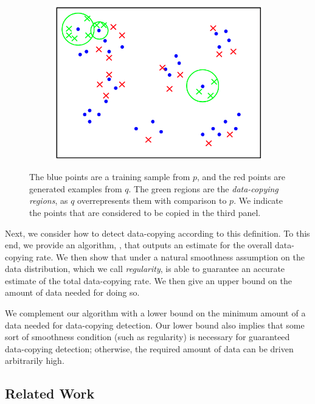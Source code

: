 \begin{figure}[ht]
\begin{subfigure}{0.31\textwidth}
	\end{subfigure}\hspace*{\fill}
	\begin{subfigure}{0.31\textwidth}\includegraphics[width=\linewidth]{data_copy.png}
	\end{subfigure}
	\caption{The blue points are a training sample from $p$, and the red points are generated examples from $q$. The green regions are the \textit{data-copying regions}, as $q$ overrepresents them with comparison to $p$. We indicate the points that are considered to be copied in the third panel.}
	
	\label{fig:triptic}
\end{figure}

Next, we consider how to detect data-copying according to this definition. To this end, we provide an algorithm, \dc{}, that outputs an estimate for the overall data-copying rate. We then show that under a natural smoothness assumption on the data distribution, which we call \textit{regularity}, \dc{} is able to guarantee an accurate estimate of the total data-copying rate. We then give an upper bound on the amount of data needed for doing so. 

We complement our algorithm with a lower bound on the minimum amount of a data needed for data-copying detection. Our lower bound also implies that some sort of smoothness condition (such as regularity) is necessary for guaranteed data-copying detection; otherwise, the required amount of data can be driven arbitrarily high.

\subsection{Related Work}


